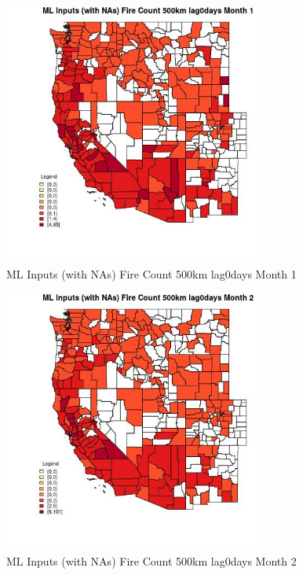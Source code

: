 \begin{figure} 
\centering  
\includegraphics[width=0.77\textwidth]{Code_Outputs/Report_ML_input_PM25_Step4_part_e_de_duplicated_aves_compiled_2019-05-20wNAs_CountyFire_Count_500km_lag0daysmedianMonth1.jpg} 
\caption{\label{fig:Report_ML_input_PM25_Step4_part_e_de_duplicated_aves_compiled_2019-05-20wNAsCountyFire_Count_500km_lag0daysmedianMonth1}ML Inputs (with NAs) Fire Count 500km lag0days Month 1} 
\end{figure} 
 

\begin{figure} 
\centering  
\includegraphics[width=0.77\textwidth]{Code_Outputs/Report_ML_input_PM25_Step4_part_e_de_duplicated_aves_compiled_2019-05-20wNAs_CountyFire_Count_500km_lag0daysmedianMonth2.jpg} 
\caption{\label{fig:Report_ML_input_PM25_Step4_part_e_de_duplicated_aves_compiled_2019-05-20wNAsCountyFire_Count_500km_lag0daysmedianMonth2}ML Inputs (with NAs) Fire Count 500km lag0days Month 2} 
\end{figure} 
 

